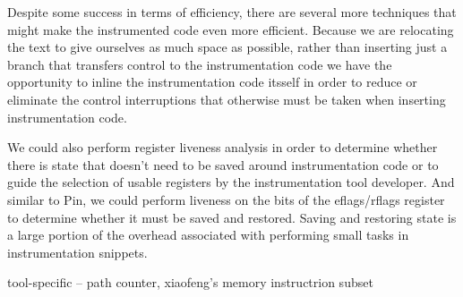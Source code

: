 Despite some success in terms of efficiency, there are several more techniques
that might make the instrumented code even more efficient. Because we are relocating
the text to give ourselves as much space as possible, rather than inserting just a branch
that transfers control to the instrumentation code we have the opportunity to inline
the instrumentation code itsself in order to reduce  or eliminate the control interruptions
that otherwise must be taken when inserting instrumentation code.

We could also perform register liveness analysis in order to determine whether there is
state that doesn't need to be saved around instrumentation code or to guide the selection
of usable registers by the instrumentation tool developer. And similar to Pin, we could perform
liveness on the bits of the eflags/rflags register to determine whether it must be saved and
restored. Saving and restoring state is a large portion of the overhead associated with performing
small tasks in instrumentation snippets.

tool-specific -- path counter, xiaofeng's memory instructrion subset